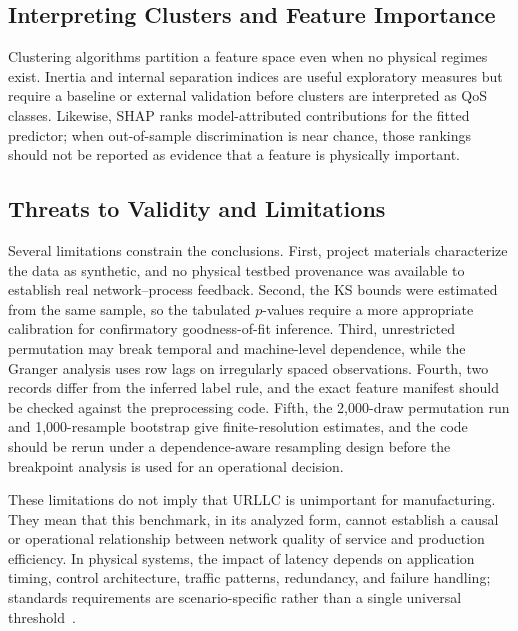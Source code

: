 \documentclass[conference]{IEEEtran}
\begin{document}
\subsection{Interpreting Clusters and Feature Importance}
Clustering algorithms partition a feature space even when no physical regimes exist. Inertia and internal separation indices are useful exploratory measures but require a baseline or external validation before clusters are interpreted as QoS classes. Likewise, SHAP ranks model-attributed contributions for the fitted predictor; when out-of-sample discrimination is near chance, those rankings should not be reported as evidence that a feature is physically important.

\subsection{Threats to Validity and Limitations}
Several limitations constrain the conclusions. First, project materials characterize the data as synthetic, and no physical testbed provenance was available to establish real network--process feedback. Second, the KS bounds were estimated from the same sample, so the tabulated $p$-values require a more appropriate calibration for confirmatory goodness-of-fit inference. Third, unrestricted permutation may break temporal and machine-level dependence, while the Granger analysis uses row lags on irregularly spaced observations. Fourth, two records differ from the inferred label rule, and the exact feature manifest should be checked against the preprocessing code. Fifth, the 2,000-draw permutation run and 1,000-resample bootstrap give finite-resolution estimates, and the code should be rerun under a dependence-aware resampling design before the breakpoint analysis is used for an operational decision.

These limitations do not imply that URLLC is unimportant for manufacturing. They mean that this benchmark, in its analyzed form, cannot establish a causal or operational relationship between network quality of service and production efficiency. In physical systems, the impact of latency depends on application timing, control architecture, traffic patterns, redundancy, and failure handling; standards requirements are scenario-specific rather than a single universal threshold~\cite{tgpp22104, vitturi2019industrial}.
\end{document}
